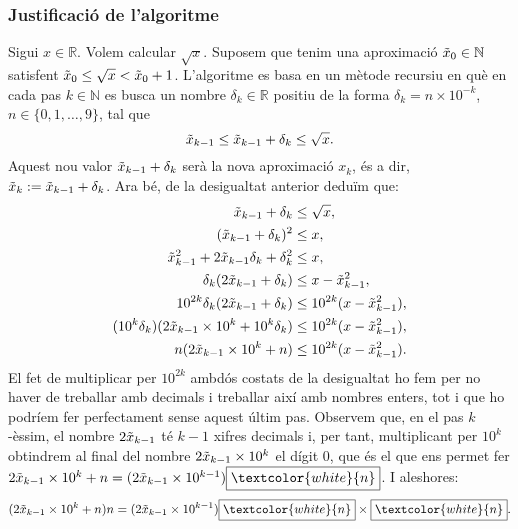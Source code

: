 \documentclass[11pt,a4paper]{article}
\theoremstyle{definition}
\begin{document}
\subsubsection{Justificació de l'algoritme}
Sigui $x\in\mathbb{R}$. Volem calcular $\sqrt{x}$. Suposem que tenim una aproximació $\Tilde{x}_0\in\mathbb{N}$ satisfent $\Tilde{x}_0\leq\sqrt{x}<\Tilde{x}_0+1$. L'algoritme es basa en un mètode recursiu en què en cada pas $k\in\mathbb{N}$ es busca un nombre $\delta_k\in\mathbb{R}$ positiu de la forma $\delta_k=n\times10^{-k}$, $n\in\{0,1,\ldots,9\}$, tal que $$\Tilde{x}_{k-1}\leq\Tilde{x}_{k-1}+\delta_k\leq\sqrt{x}.$$ Aquest nou valor $\Tilde{x}_{k-1}+\delta_k$ serà la nova aproximació $x_k$, és a dir, $\Tilde{x}_k:=\Tilde{x}_{k-1}+\delta_k$. Ara bé, de la desigualtat anterior deduïm que:
\begin{align}
    \nonumber\Tilde{x}_{k-1}+\delta_k                                & \leq\sqrt{x},                      \\
    \nonumber(\Tilde{x}_{k-1}+\delta_k)^2                            & \leq x,                            \\
    \nonumber\Tilde{x}_{k-1}^2+2\Tilde{x}_{k-1}\delta_k+\delta_k^2   & \leq x,                            \\
    \nonumber\delta_k(2\Tilde{x}_{k-1}+\delta_k)                     & \leq x-\Tilde{x}_{k-1}^2,          \\
    \nonumber10^{2k}\delta_k(2\Tilde{x}_{k-1}+\delta_k)              & \leq 10^{2k}(x-\Tilde{x}_{k-1}^2), \\
    \nonumber(10^k\delta_k)(2\Tilde{x}_{k-1}\times10^k+10^k\delta_k) & \leq 10^{2k}(x-\Tilde{x}_{k-1}^2), \\
    n(2\Tilde{x}_{k-1}\times10^k+n)                                  & \leq 10^{2k}(x-\Tilde{x}_{k-1}^2).
    \label{eq1}
\end{align}
El fet de multiplicar per $10^{2k}$ ambdós costats de la desigualtat ho fem per no haver de treballar amb decimals i treballar així amb nombres enters, tot i que ho podríem fer perfectament sense aquest últim pas. Observem que, en el pas $k$-èssim, el nombre $2\Tilde{x}_{k-1}$ té $k-1$ xifres decimals i, per tant, multiplicant per $10^k$ obtindrem al final del nombre $2\Tilde{x}_{k-1}\times10^k$ el dígit 0, que és el que ens permet fer $2\Tilde{x}_{k-1}\times10^k+n=(2\Tilde{x}_{k-1}\times10^{k-1})\boxed{\textcolor{white}{n}}$. I aleshores:
\begin{equation}
    (2\Tilde{x}_{k-1}\times10^k+n)n=(2\Tilde{x}_{k-1}\times10^{k-1})\boxed{\textcolor{white}{n}}\times\boxed{\textcolor{white}{n}}.
    \label{eq2}
\end{equation}
\end{document}
